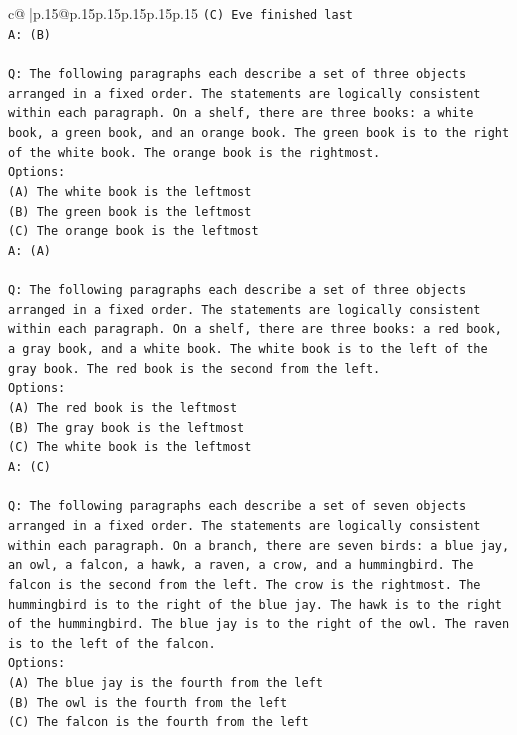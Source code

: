 \documentclass{article}
\begin{document}
{\begin{supertabular}{c@{$\;$}|p{.15\linewidth}@{}p{.15\linewidth}p{.15\linewidth}p{.15\linewidth}p{.15\linewidth}p{.15\linewidth}}
{{{\texttt{(C) Eve finished last} \\
\texttt{A: (B)} \\
\\ 
\texttt{Q: The following paragraphs each describe a set of three objects arranged in a fixed order. The statements are logically consistent within each paragraph. On a shelf, there are three books: a white book, a green book, and an orange book. The green book is to the right of the white book. The orange book is the rightmost.} \\
\texttt{Options:} \\
\texttt{(A) The white book is the leftmost} \\
\texttt{(B) The green book is the leftmost} \\
\texttt{(C) The orange book is the leftmost} \\
\texttt{A: (A)} \\
\\ 
\texttt{Q: The following paragraphs each describe a set of three objects arranged in a fixed order. The statements are logically consistent within each paragraph. On a shelf, there are three books: a red book, a gray book, and a white book. The white book is to the left of the gray book. The red book is the second from the left.} \\
\texttt{Options:} \\
\texttt{(A) The red book is the leftmost} \\
\texttt{(B) The gray book is the leftmost} \\
\texttt{(C) The white book is the leftmost} \\
\texttt{A: (C)} \\
\\ 
\texttt{Q: The following paragraphs each describe a set of seven objects arranged in a fixed order. The statements are logically consistent within each paragraph. On a branch, there are seven birds: a blue jay, an owl, a falcon, a hawk, a raven, a crow, and a hummingbird. The falcon is the second from the left. The crow is the rightmost. The hummingbird is to the right of the blue jay. The hawk is to the right of the hummingbird. The blue jay is to the right of the owl. The raven is to the left of the falcon.} \\
\texttt{Options:} \\
\texttt{(A) The blue jay is the fourth from the left} \\
\texttt{(B) The owl is the fourth from the left} \\
\texttt{(C) The falcon is the fourth from the left} \\
}}}
\end{supertabular}}
\end{document}
